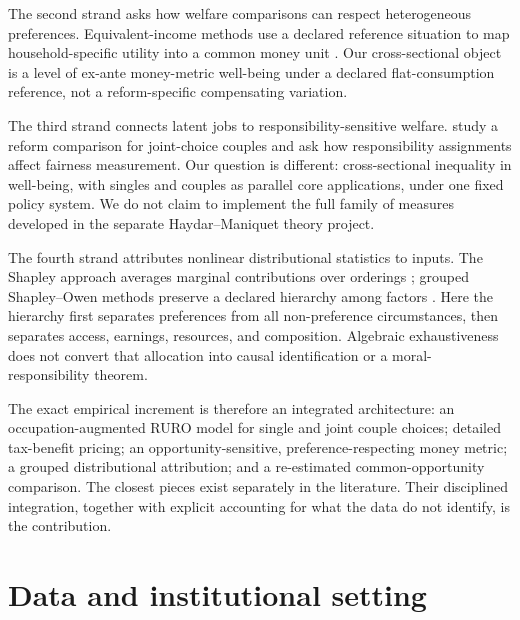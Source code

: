 \documentclass[11pt,a4paper]{article}
\begin{document}
The second strand asks how welfare comparisons can respect heterogeneous
preferences. Equivalent-income methods use a declared reference situation to
map household-specific utility into a common money unit
\citep{dagsvikkarlstrom2005,decosterhaan2015,decancq2015,bargain2013}. Our
cross-sectional object is a level of ex-ante money-metric well-being under a
declared flat-consumption reference, not a reform-specific compensating
variation.

The third strand connects latent jobs to responsibility-sensitive welfare.
\citet{jacquet2026} study a reform comparison for joint-choice couples and ask
how responsibility assignments affect fairness measurement. Our question is
different: cross-sectional inequality in well-being, with singles and couples
as parallel core applications, under one fixed policy system. We do not claim to
implement the full family of measures developed in the separate
Haydar--Maniquet theory project.

The fourth strand attributes nonlinear distributional statistics to inputs.
The Shapley approach averages marginal contributions over orderings
\citep{shorrocks2013}; grouped Shapley--Owen methods preserve a declared
hierarchy among factors \citep{audoly2025}. Here the hierarchy first separates
preferences from all non-preference circumstances, then separates access,
earnings, resources, and composition. Algebraic exhaustiveness does not convert
that allocation into causal identification or a moral-responsibility theorem.

The exact empirical increment is therefore an integrated architecture: an
occupation-augmented RURO model for single and joint couple choices; detailed
tax-benefit pricing; an opportunity-sensitive, preference-respecting money
metric; a grouped distributional attribution; and a re-estimated
common-opportunity comparison. The closest pieces exist separately in the
literature. Their disciplined integration, together with explicit accounting
for what the data do not identify, is the contribution.

\section{Data and institutional setting}
\end{document}
